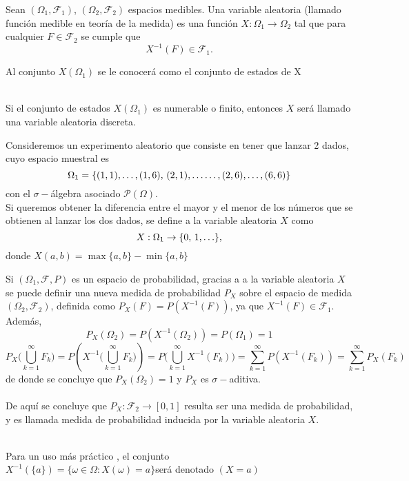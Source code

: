 \begin{Def}
    Sean $(\Omega_1,\mathscr{F}_1)$, $(\Omega_2,\mathscr{F}_2)$ espacios medibles. Una variable aleatoria (llamado función medible en teoría de la medida) es una función $X:\Omega_1\rightarrow \Omega_2$ tal que para cualquier $F\in\mathscr{F}_2$ se cumple que $$X^{-1}(F)\in\mathscr{F}_1.$$
\end{Def}
 Al conjunto $X(\Omega_1)$ se le conocerá como el conjunto de estados de X\\\\
\begin{Obs}
    Si el conjunto de estados $X(\Omega_1)$ es numerable o finito, entonces $X$ será llamado una variable aleatoria discreta.
\end{Obs}
\begin{Ejm}
  Consideremos un experimento aleatorio que consiste en tener que lanzar 2 dados, cuyo  espacio muestral es $$\Omega_1=\{(1,1),\ldots,(1,6),\thinspace(2,1),\ldots\ldots,(2,6),\ldots,(6,6)\}$$ con el $\sigma-$álgebra asociado $\mathscr{P}(\Omega)$.\\ 
   Si queremos obtener la diferencia entre el mayor y el menor de los números que se obtienen al lanzar los dos dados, se define a la variable aleatoria $X$ como $$X:\Omega_1\rightarrow \{0,\thinspace 1,\ldots\},$$ donde $X(a,b)=\max \{a,b\}-\min\{a,b\}$
\end{Ejm}
Si $(\Omega_1,\mathscr{F},P)$ es un espacio de probabilidad, gracias a a la variable aleatoria $X$ se puede definir una nueva medida de probabilidad $P_X$ sobre el espacio de medida $(\Omega_2,\mathscr{F}_2)$, definida como $P_X(F)=P(X^{-1}(F))$, ya que $X^{-1}(F)\in\mathscr{F}_1$. Además, $$P_X(\Omega_2)=P(X^{-1}(\Omega_2))=P(\Omega_1)=1$$ $$P_X\big(\bigcup_{k=1}^\infty F_k\big)=P(X^{-1}\big(\bigcup_{k=1}^\infty
F_k\big))=P \big(\bigcup_{k=1}^\infty X^{-1}(F_k) \big)=\sum_{k=1}^\infty P(X^{-1}(F_k))=\sum_{k=1}^\infty P_X(F_k)$$
de donde se concluye que $P_X(\Omega_2)= 1$ y $P_X$ es $\sigma-$aditiva.\\\\
De aquí se concluye que $P_X:\mathscr{F_2}\rightarrow [0,1]$ resulta ser una medida de probabilidad, y es llamada medida de probabilidad inducida por la variable aleatoria $X$.\\\\
\begin{Obs}
    Para un uso más práctico , el conjunto\\ $X^{-1}(\{a\})=\{\omega\in\Omega: X(\omega)=a\}$será denotado $(X= a)$\\
\end{Obs}
